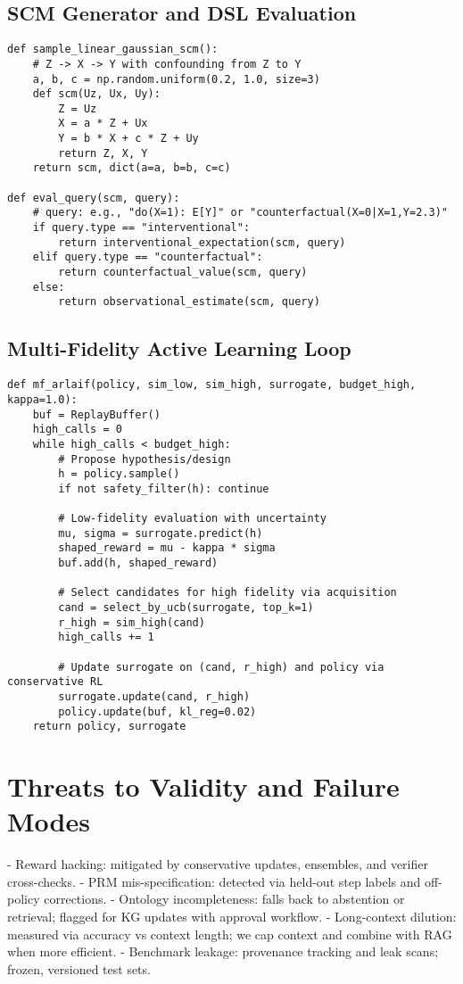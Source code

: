 \documentclass{article}
\begin{document}
\subsection{SCM Generator and DSL Evaluation}
\begin{lstlisting}[style=py, caption={Synthetic SCM generation and DSL-evaluable queries.}]
def sample_linear_gaussian_scm():
    # Z -> X -> Y with confounding from Z to Y
    a, b, c = np.random.uniform(0.2, 1.0, size=3)
    def scm(Uz, Ux, Uy):
        Z = Uz
        X = a * Z + Ux
        Y = b * X + c * Z + Uy
        return Z, X, Y
    return scm, dict(a=a, b=b, c=c)

def eval_query(scm, query):
    # query: e.g., "do(X=1): E[Y]" or "counterfactual(X=0|X=1,Y=2.3)"
    if query.type == "interventional":
        return interventional_expectation(scm, query)
    elif query.type == "counterfactual":
        return counterfactual_value(scm, query)
    else:
        return observational_estimate(scm, query)
\end{lstlisting}

\subsection{Multi-Fidelity Active Learning Loop}
\begin{lstlisting}[style=py, caption={MF-ARLAIF with UCB-style acquisition and safety filters.}]
def mf_arlaif(policy, sim_low, sim_high, surrogate, budget_high, kappa=1.0):
    buf = ReplayBuffer()
    high_calls = 0
    while high_calls < budget_high:
        # Propose hypothesis/design
        h = policy.sample()
        if not safety_filter(h): continue

        # Low-fidelity evaluation with uncertainty
        mu, sigma = surrogate.predict(h)
        shaped_reward = mu - kappa * sigma
        buf.add(h, shaped_reward)

        # Select candidates for high fidelity via acquisition
        cand = select_by_ucb(surrogate, top_k=1)
        r_high = sim_high(cand)
        high_calls += 1

        # Update surrogate on (cand, r_high) and policy via conservative RL
        surrogate.update(cand, r_high)
        policy.update(buf, kl_reg=0.02)
    return policy, surrogate
\end{lstlisting}

\section{Threats to Validity and Failure Modes}
- Reward hacking: mitigated by conservative updates, ensembles, and verifier cross-checks.
- PRM mis-specification: detected via held-out step labels and off-policy corrections.
- Ontology incompleteness: falls back to abstention or retrieval; flagged for KG updates with approval workflow.
- Long-context dilution: measured via accuracy vs context length; we cap context and combine with RAG when more efficient.
- Benchmark leakage: provenance tracking and leak scans; frozen, versioned test sets.
\end{document}
